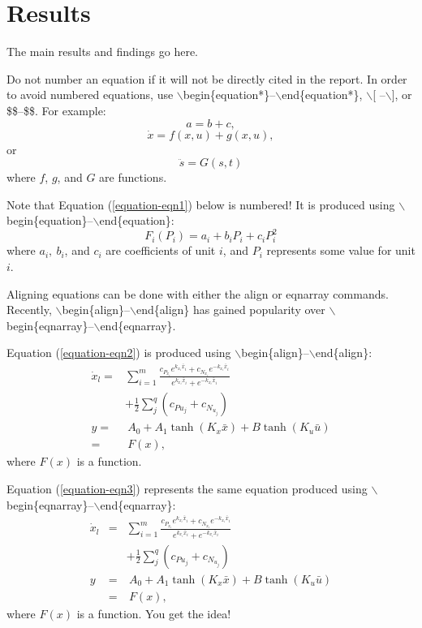 \documentclass[conference]{IEEEtran}
\begin{document}
\section{Results}
The main results and findings go here.

Do not number an equation if it will not be directly cited in the
report. In order to avoid numbered equations, use
$\backslash$begin\{equation*\}--$\backslash$end\{equation*\},
$\backslash$[ --$\backslash$], or \$\$--\$\$.  For example:
\begin{equation*}
a = b + c,
\end{equation*}
$$\dot x = f(x,u) + g(x,u),$$
or
\[\ddot s=G(s,t)\]
where $f$, $g$, and $G$ are functions.

Note that Equation (\ref{equation-eqn1}) below is numbered!  It is
produced using $\backslash$begin\{equation\}--$\backslash$end\{equation\}:
\begin{equation}
F_i(P_i)=a_{i}+b_{i}P_i+c_{i}P_{i}^2
\label{equation-eqn1}
\end{equation}
where $a_{i},\ b_{i}$, and $c_{i}$ are coefficients of unit $i$, and $P_i$
represents some value for unit $i$.

Aligning equations can be done with
either the align or eqnarray commands.  Recently,
$\backslash$begin\{align\}--$\backslash$end\{align\} has gained popularity
over $\backslash$begin\{eqnarray\}--$\backslash$end\{eqnarray\}.

Equation (\ref{equation-eqn2}) is produced using
$\backslash$begin\{align\}--$\backslash$end\{align\}:
\begin{align}
\dot {x}_l=& \sum_{i = 1}^m {\frac{c_{P_{x_i} } e^{k_{x_i}\bar{x}_i} + c_{N_{x_i} }
e^{ -  k_{x_i} \bar{x}_i}}{e^{k_{x_i} \bar{x}_i} + e^{ - k_{x_i} \bar{x}_i}}} \nonumber\\
& + \frac{1}{2}\sum\limits_j^q (c_{P{u_j }} + c_{N _{u_j }} ) \nonumber\\
y=& \ A_0 + A_1 \tanh (K_x \bar {x}) + B\tanh (K_u \bar {u}) \nonumber\\
 =& \ F(x),
\label{equation-eqn2}
\end{align}
where $F(x)$ is a function.

Equation (\ref{equation-eqn3}) represents the same equation produced
using $\backslash$begin\{eqnarray\}--$\backslash$end\{eqnarray\}:
\begin{eqnarray}
\dot {x}_l&=& \sum_{i = 1}^m {\frac{c_{P_{x_i} } e^{k_{x_i}\bar{x}_i} + c_{N_{x_i} }
e^{ - k_{x_i} \bar{x}_i}}{e^{k_{x_i} \bar{x}_i} + e^{ - k_{x_i} \bar{x}_i}}} \nonumber\\
&&+ \frac{1}{2}\sum\limits_j^q (c_{P{u_j }} + c_{N _{u_j }} ) \nonumber\\
y&=& \ A_0 + A_1 \tanh (K_x \bar {x}) + B\tanh (K_u \bar {u})\nonumber\\
&=& \ F(x),
\label{equation-eqn3}
\end{eqnarray}
where $F(x)$ is a function.  You get the idea!
\end{document}
